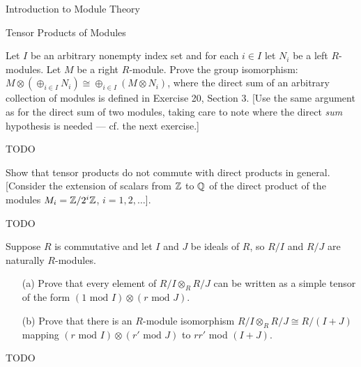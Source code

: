\begin{chapter}{Introduction to Module Theory}
\begin{section}{Tensor Products of Modules}
\begin{solution}
\end{solution}\oneperpage



\begin{problem}\label{ex:10.4.14}
Let $I$ be an arbitrary nonempty index set and for each $i\in I$ let $N_i$ be a left $R$-modules. Let $M$ be a right $R$-module. Prove the group isomorphism: $M\otimes (\oplus_{i\in I} N_i)\cong \oplus_{i\in I}(M\otimes N_i)$, where the direct sum of an arbitrary collection of modules is defined in Exercise 20, Section 3. [Use the same argument as for the direct sum of two modules, taking care to note where the direct \emph{sum} hypothesis is needed --- cf. the next exercise.]
\end{problem}
\begin{solution}TODO

\end{solution}\oneperpage



\begin{problem}\label{ex:10.4.15}
Show that tensor products do not commute with direct products in general. [Consider the extension of scalars from $\mathbb{Z}$ to $\mathbb{Q}$ of the direct product of the modules $M_i = \mathbb{Z}/2^i\mathbb{Z}$, $i=1,2,\ldots$]. 
\end{problem}
\begin{solution}TODO

\end{solution}\oneperpage



\begin{problem}\label{ex:10.4.16}
Suppose $R$ is commutative and let $I$ and $J$ be ideals of $R$, so $R/I$ and $R/J$ are naturally $R$-modules. \begin{enumerate}
\item[(a)] Prove that every element of $R/I\otimes _R R/J$ can be written as a simple tensor of the form $(1\text{ mod } I)\otimes (r\text{ mod } J)$. 
\item[(b)] Prove that there is an $R$-module isomorphism $R/I\otimes_R R/J\cong R/(I+J)$ mapping $(r\text{ mod } I)\otimes (r'\text{ mod } J)$ to $rr'$ mod $(I+J)$. 
\end{enumerate}
\end{problem}
\begin{solution}TODO

\end{solution}\oneperpage




\end{section}
\end{chapter}
